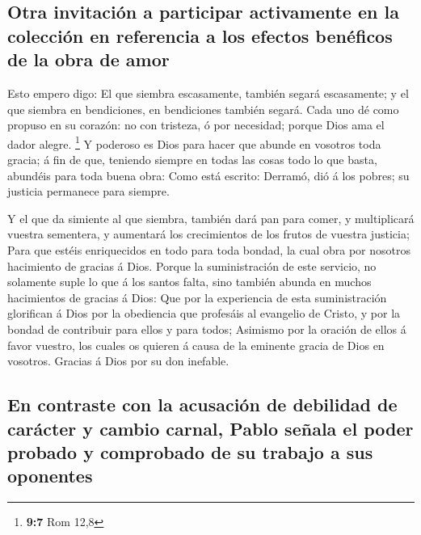 \hypertarget{otra-invitaciuxf3n-a-participar-activamente-en-la-colecciuxf3n-en-referencia-a-los-efectos-benuxe9ficos-de-la-obra-de-amor}{%
\subsection{Otra invitación a participar activamente en la colección en
referencia a los efectos benéficos de la obra de
amor}\label{otra-invitaciuxf3n-a-participar-activamente-en-la-colecciuxf3n-en-referencia-a-los-efectos-benuxe9ficos-de-la-obra-de-amor}}

 Esto empero digo: El que siembra escasamente, también
segará escasamente; y el que siembra en bendiciones, en bendiciones
también segará.  Cada uno dé como propuso en su corazón: no
con tristeza, ó por necesidad; porque Dios ama el dador alegre.
\footnote{\textbf{9:7} Rom 12,8}  Y poderoso es Dios para
hacer que abunde en vosotros toda gracia; á fin de que, teniendo siempre
en todas las cosas todo lo que basta, abundéis para toda buena obra:
 Como está escrito: Derramó, dió á los pobres; su justicia
permanece para siempre.

 Y el que da simiente al que siembra, también dará pan para
comer, y multiplicará vuestra sementera, y aumentará los crecimientos de
los frutos de vuestra justicia;  Para que estéis
enriquecidos en todo para toda bondad, la cual obra por nosotros
hacimiento de gracias á Dios.  Porque la suministración de
este servicio, no solamente suple lo que á los santos falta, sino
también abunda en muchos hacimientos de gracias á Dios: 
Que por la experiencia de esta suministración glorifican á Dios por la
obediencia que profesáis al evangelio de Cristo, y por la bondad de
contribuir para ellos y para todos;  Asimismo por la
oración de ellos á favor vuestro, los cuales os quieren á causa de la
eminente gracia de Dios en vosotros.  Gracias á Dios por su
don inefable.

\hypertarget{en-contraste-con-la-acusaciuxf3n-de-debilidad-de-caruxe1cter-y-cambio-carnal-pablo-seuxf1ala-el-poder-probado-y-comprobado-de-su-trabajo-a-sus-oponentes}{%
\subsection{En contraste con la acusación de debilidad de carácter y
cambio carnal, Pablo señala el poder probado y comprobado de su trabajo
a sus
oponentes}\label{en-contraste-con-la-acusaciuxf3n-de-debilidad-de-caruxe1cter-y-cambio-carnal-pablo-seuxf1ala-el-poder-probado-y-comprobado-de-su-trabajo-a-sus-oponentes}}

